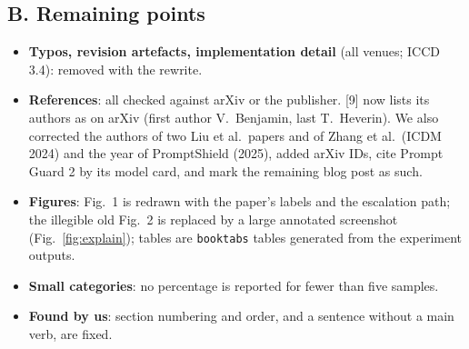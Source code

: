\subsection*{B. Remaining points}
\begin{itemize}\setlength{\itemsep}{1pt}
\item \textbf{Typos, revision artefacts, implementation detail} (all venues; ICCD 3.4): removed with the rewrite.
\item \textbf{References}: all checked against arXiv or the publisher. [9] now lists its authors as on arXiv
(first author V.~Benjamin, last T.~Heverin). We also corrected the authors of two Liu et al.\ papers and of
Zhang et al.\ (ICDM 2024) and the year of PromptShield (2025), added arXiv IDs, cite Prompt Guard 2 by its
model card, and mark the remaining blog post as such.
\item \textbf{Figures}: Fig.~1 is redrawn with the paper's labels and the escalation path; the illegible old
Fig.~2 is replaced by a large annotated screenshot (Fig.~\ref{fig:explain}); tables are \texttt{booktabs} tables
generated from the experiment outputs.
\item \textbf{Small categories}: no percentage is reported for fewer than five samples.
\item \textbf{Found by us}: section numbering and order, and a sentence without a main verb, are fixed.
\end{itemize}
